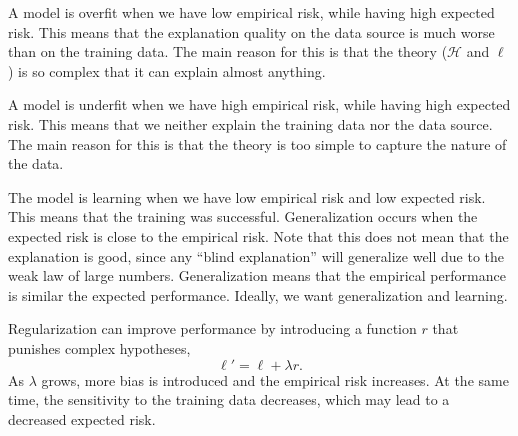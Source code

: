A model is overfit when we have low empirical risk, while having high expected risk. This means
that the explanation quality on the data source is much worse than on the training data. The main
reason for this is that the theory ($\mathcal{H}$ and $\ell$) is so complex that it can explain
almost anything.

A model is underfit when we have high empirical risk, while having high expected risk. This means
that we neither explain the training data nor the data source. The main reason for this is that the
theory is too simple to capture the nature of the data.

The model is learning when we have low empirical risk and low expected risk. This means that the
training was successful. Generalization occurs when the expected risk is close to the empirical
risk. Note that this does not mean that the explanation is good, since any ``blind explanation''
will generalize well due to the weak law of large numbers. Generalization means that the empirical
performance is similar the expected performance. Ideally, we want generalization and learning.

Regularization can improve performance by introducing a function $r$ that punishes complex
hypotheses, \[
    \ell' = \ell + \lambda r.
\]
As $\lambda$ grows, more bias is introduced and the empirical risk increases. At the same time, the
sensitivity to the training data decreases, which may lead to a decreased expected risk.
